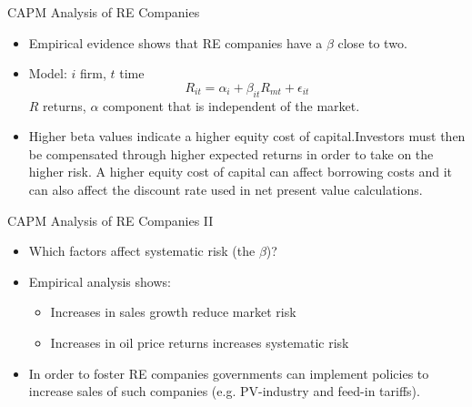 {CAPM Analysis of RE Companies}
\begin{itemize}
\item<1-> Empirical evidence shows that RE companies have a $\beta$ close to two.
\item<2-> Model: $i$ firm, $t$ time
$$
R_{it}= \alpha_i + \beta_{it} R_{mt}+\epsilon_{it}
$$
$R$ returns, $\alpha$ component that is independent of the market.
\item<3-> Higher beta values indicate a higher equity cost of capital.Investors must then be compensated
through higher expected returns in order to take on the higher risk. A higher equity cost of capital can affect borrowing costs and
it can also affect the discount rate used in net present value calculations.
\end{itemize}



{CAPM Analysis of RE Companies II}
\begin{itemize}
\item<1-> Which factors affect systematic risk (the $\beta$)?
\item<2-> Empirical analysis shows:
\begin{itemize}
\item Increases in sales growth reduce market risk
\item Increases in oil price returns increases systematic risk
\end{itemize}
\item<3-> In order to foster RE companies governments can implement policies to increase sales of such companies (e.g. PV-industry and feed-in tariffs).
\end{itemize}




